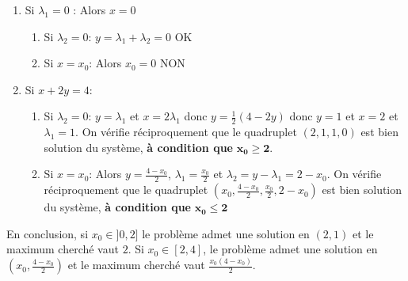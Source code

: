 \documentclass{report}
\begin{document}
\begin{enumerate}
\item Si $\lambda_1=0$ : \newline
Alors $x=0$
\begin{enumerate}
\item Si $\lambda_2=0$: \newline
$y=\lambda_1+\lambda_2=0$ \quad OK
\item Si $x=x_0$:
Alors $x_0=0$ \quad NON
\end{enumerate}
\item Si $x+2y=4$:
\begin{enumerate}
\item Si $\lambda_2=0$: \newline
$y=\lambda_1$ et $x=2\lambda_1$ donc $y=\frac 12 (4-2y)$ donc $y=1$ et $x=2$ et $\lambda_1=1$. \newline
On vérifie réciproquement que le quadruplet $(2,1,1,0)$ est bien solution du système, \textbf{à condition que} $\mathbf{x_0\geq 2}$.
\item Si $x=x_0$: \newline
Alors $y=\frac{4-x_0}{2}$, $\lambda_1=\frac{x_0}{2}$ et $\lambda_2=y-\lambda_1=2-x_0$.\newline
On vérifie réciproquement que le quadruplet $(x_0,\frac{4-x_0}{2},\frac{x_0}{2},2-x_0)$ est bien solution du système, \textbf{à condition que} $\mathbf{x_0\leq 2}$
\end{enumerate}
\end{enumerate}
En conclusion, si $x_0\in ]0,2]$ le problème admet une solution en $(2,1)$ et le maximum cherché vaut $2$. \newline
Si $x_0\in [2, 4]$, le problème admet une solution en $(x_0,\frac{4-x_0}{2})$ et le maximum cherché vaut $\frac{x_0(4-x_0)}{2}$.
 
\subsection{} \noindent\fbox{
\parbox{\linewidth}{

}}\\ 
\\ 
\\
\noindent
\end{document}
